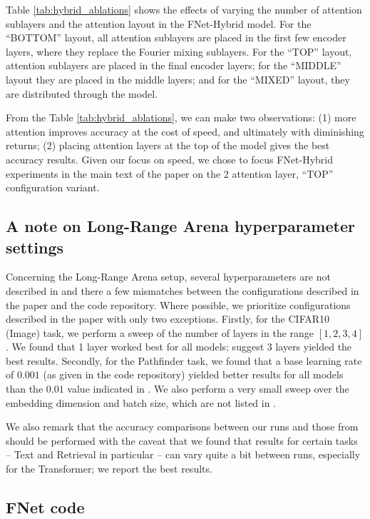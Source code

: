 Table \ref{tab:hybrid_ablations} shows the effects of varying the number of attention sublayers and the attention layout in the FNet-Hybrid model. For the ``BOTTOM'' layout, all attention sublayers are placed in the first few encoder layers, where they replace the Fourier mixing sublayers. For the ``TOP'' layout, attention sublayers are placed in the final encoder layers; for the ``MIDDLE'' layout they are placed in the middle layers; and for the ``MIXED'' layout, they are distributed through the model.

From the Table \ref{tab:hybrid_ablations}, we can make two observations: (1) more attention improves accuracy at the cost of speed, and ultimately with diminishing returns; (2) placing attention layers at the top of the model gives the best accuracy results. Given our focus on speed, we chose to focus FNet-Hybrid experiments in the main text of the paper on the 2 attention layer, ``TOP'' configuration variant.


\subsection{A note on Long-Range Arena hyperparameter settings}
\label{app:lra}

Concerning the Long-Range Arena setup, several hyperparameters are not described in \citet{tay2020long} and there a few mismatches between the configurations described in the paper and the code repository. Where possible, we prioritize configurations described in the paper with only two exceptions. Firstly, for the CIFAR10 (Image) task, we perform a sweep of the number of layers in the range $[1, 2, 3, 4]$. We found that 1 layer worked best for all models; \citet{tay2020long} suggest 3 layers yielded the best results. Secondly, for the Pathfinder task, we found that a base learning rate of $0.001$ (as given in the code repository) yielded better results for all models than the $0.01$ value indicated in \citet{tay2020long}.  We also perform a very small sweep over the embedding dimension and batch size, which are not listed in \citet{tay2020long}.

We also remark that the accuracy comparisons between our runs and those from \citet{tay2020long} should be performed with the caveat that we found that results for certain tasks -- Text and Retrieval in particular -- can vary quite a bit between runs, especially for the Transformer; we report the best results.


\subsection{FNet code}
\label{app:code}

